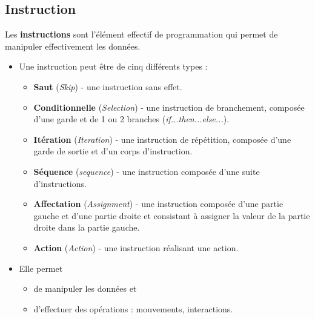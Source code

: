 \subsection{Instruction}
Les \textbf{instructions} sont l'élément effectif de programmation qui permet de manipuler effectivement les données.
\begin{itemize}
    \item Une instruction peut être de cinq différents types :
        \begin{itemize}
            \item \textbf{Saut} (\textit{Skip}) - une instruction sans effet.
            \item \textbf{Conditionnelle} (\textit{Selection}) - une instruction de branchement, composée d'une garde et de 1 ou 2 branches (\textit{if...then...else...}).
            \item \textbf{Itération} (\textit{Iteration}) - une instruction de répétition, composée d'une garde de sortie et d'un corps d'instruction.
            \item \textbf{Séquence} (\textit{sequence}) - une instruction composée d'une suite d'instructions.
            \item \textbf{Affectation} (\textit{Assignment}) - une instruction composée d'une partie gauche et d'une partie droite et consistant à assigner la valeur de la partie droite dans la partie gauche.
            \item \textbf{Action} (\textit{Action}) - une instruction réalisant une action.
        \end{itemize}
    \item Elle permet
        \begin{itemize}
            \item de manipuler les données et
            \item d'effectuer des opérations : mouvements, interactions.
        \end{itemize}
\end{itemize}